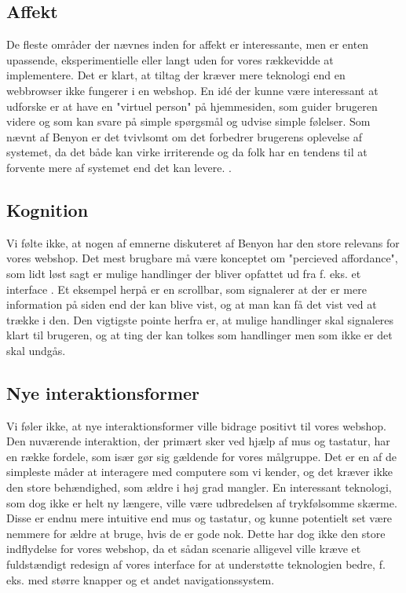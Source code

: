 \subsection{Affekt}
De fleste områder der nævnes inden for affekt er interessante, men er enten upassende, eksperimentielle eller langt uden for vores rækkevidde at
implementere. Det er klart, at tiltag der kræver mere teknologi end en webbrowser ikke fungerer i en webshop. En idé der kunne være interessant
at udforske er at have en "virtuel person" på hjemmesiden, som guider brugeren videre og som kan svare på simple spørgsmål og udvise simple følelser.
Som nævnt af Benyon er det tvivlsomt om det forbedrer brugerens oplevelse af systemet, da det både kan virke irriterende og da folk har en tendens
til at forvente mere af systemet end det kan levere. \cite[s. 571]{Benyon2010}.

\subsection{Kognition}
Vi følte ikke, at nogen af emnerne diskuteret af Benyon har den store relevans for vores webshop. Det mest brugbare må være konceptet om
"percieved affordance", som lidt løst sagt er mulige handlinger der bliver opfattet ud fra f. eks. et interface \cite[s.588]{Benyon2010}. Et
eksempel herpå er en scrollbar, som signalerer at der er mere information på siden end der kan blive vist, og at man kan få det vist ved at
trække i den. Den vigtigste pointe herfra er, at mulige handlinger skal signaleres klart til brugeren, og at ting der kan tolkes som handlinger
men som ikke er det skal undgås.

\subsection{Nye interaktionsformer}
Vi føler ikke, at nye interaktionsformer ville bidrage positivt til vores webshop. Den nuværende interaktion, der primært sker ved hjælp
af mus og tastatur, har en række fordele, som især gør sig gældende for vores målgruppe. Det er en af de simpleste måder at interagere
med computere som vi kender, og det kræver ikke den store behændighed, som ældre i høj grad mangler. En interessant teknologi, som dog ikke er
helt ny længere, ville være udbredelsen af trykfølsomme skærme. Disse er endnu mere intuitive end mus og tastatur, og kunne potentielt set være
nemmere for ældre at bruge, hvis de er gode nok. Dette har dog ikke den store indflydelse for vores webshop, da et sådan scenarie alligevel ville kræve
et fuldstændigt redesign af vores interface for at understøtte teknologien bedre, f. eks. med større knapper og et andet navigationssystem.

